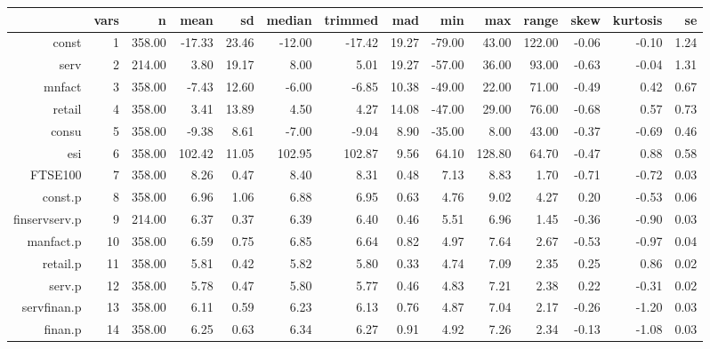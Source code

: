 \documentclass[10pt,a4paper]{report}
\begin{document}
	\begin{landscape}
		\begin{table}[ht]
			\centering
			\begin{tabular}{rrrrrrrrrrrrrr}
				\hline
				& vars & n & mean & sd & median & trimmed & mad & min & max & range & skew & kurtosis & se \\ 
				\hline
				const &   1 & 358.00 & -17.33 & 23.46 & -12.00 & -17.42 & 19.27 & -79.00 & 43.00 & 122.00 & -0.06 & -0.10 & 1.24 \\ 
				serv &   2 & 214.00 & 3.80 & 19.17 & 8.00 & 5.01 & 19.27 & -57.00 & 36.00 & 93.00 & -0.63 & -0.04 & 1.31 \\ 
				mnfact &   3 & 358.00 & -7.43 & 12.60 & -6.00 & -6.85 & 10.38 & -49.00 & 22.00 & 71.00 & -0.49 & 0.42 & 0.67 \\ 
				retail &   4 & 358.00 & 3.41 & 13.89 & 4.50 & 4.27 & 14.08 & -47.00 & 29.00 & 76.00 & -0.68 & 0.57 & 0.73 \\ 
				consu &   5 & 358.00 & -9.38 & 8.61 & -7.00 & -9.04 & 8.90 & -35.00 & 8.00 & 43.00 & -0.37 & -0.69 & 0.46 \\ 
				esi &   6 & 358.00 & 102.42 & 11.05 & 102.95 & 102.87 & 9.56 & 64.10 & 128.80 & 64.70 & -0.47 & 0.88 & 0.58 \\ 
				FTSE100 &   7 & 358.00 & 8.26 & 0.47 & 8.40 & 8.31 & 0.48 & 7.13 & 8.83 & 1.70 & -0.71 & -0.72 & 0.03 \\ 
				const.p &   8 & 358.00 & 6.96 & 1.06 & 6.88 & 6.95 & 0.63 & 4.76 & 9.02 & 4.27 & 0.20 & -0.53 & 0.06 \\ 
				finservserv.p &   9 & 214.00 & 6.37 & 0.37 & 6.39 & 6.40 & 0.46 & 5.51 & 6.96 & 1.45 & -0.36 & -0.90 & 0.03 \\ 
				manfact.p &  10 & 358.00 & 6.59 & 0.75 & 6.85 & 6.64 & 0.82 & 4.97 & 7.64 & 2.67 & -0.53 & -0.97 & 0.04 \\ 
				retail.p &  11 & 358.00 & 5.81 & 0.42 & 5.82 & 5.80 & 0.33 & 4.74 & 7.09 & 2.35 & 0.25 & 0.86 & 0.02 \\ 
				serv.p &  12 & 358.00 & 5.78 & 0.47 & 5.80 & 5.77 & 0.46 & 4.83 & 7.21 & 2.38 & 0.22 & -0.31 & 0.02 \\ 
				servfinan.p &  13 & 358.00 & 6.11 & 0.59 & 6.23 & 6.13 & 0.76 & 4.87 & 7.04 & 2.17 & -0.26 & -1.20 & 0.03 \\ 
				finan.p &  14 & 358.00 & 6.25 & 0.63 & 6.34 & 6.27 & 0.91 & 4.92 & 7.26 & 2.34 & -0.13 & -1.08 & 0.03 \\ 
				\hline
			\end{tabular}
		\end{table}
	\end{landscape}
\end{document}
